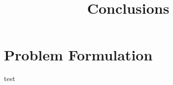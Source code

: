 \documentclass{article}
\begin{document}
\title{Conclusions}
\maketitle \else \fi

\section{Problem Formulation}\label{sec:problem}

test

\ifx \allfiles \undefined
\end{document}
